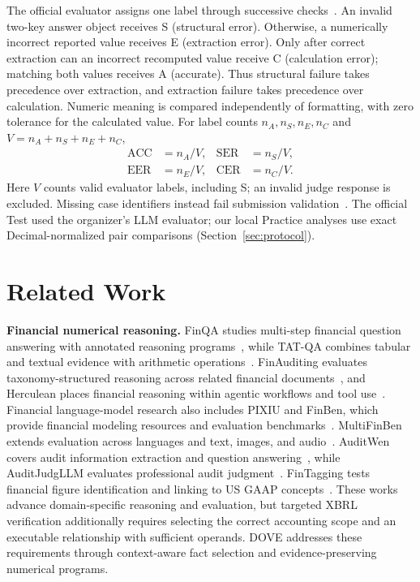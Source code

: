 \documentclass[conference]{IEEEtran}
\begin{document}
The official evaluator assigns one label through successive checks~\cite{task3scoring,task3results}. An invalid two-key answer object receives S (structural error). Otherwise, a numerically incorrect reported value receives E (extraction error). Only after correct extraction can an incorrect recomputed value receive C (calculation error); matching both values receives A (accurate). Thus structural failure takes precedence over extraction, and extraction failure takes precedence over calculation. Numeric meaning is compared independently of formatting, with zero tolerance for the calculated value. For label counts $n_A,n_S,n_E,n_C$ and $V=n_A+n_S+n_E+n_C$,
\begin{equation}
\begin{aligned}
\mathrm{ACC}&=n_A/V, & \mathrm{SER}&=n_S/V,\\
\mathrm{EER}&=n_E/V, & \mathrm{CER}&=n_C/V.
\end{aligned}
\end{equation}
Here $V$ counts valid evaluator labels, including S; an invalid judge response is excluded. Missing case identifiers instead fail submission validation~\cite{task3submission}. The official Test used the organizer's LLM evaluator; our local Practice analyses use exact Decimal-normalized pair comparisons (Section~\ref{sec:protocol}).

\section{Related Work}
\label{sec:related}

\noindent\textbf{Financial numerical reasoning.}
FinQA studies multi-step financial question answering with annotated reasoning programs~\cite{chen-etal-2021-finqa}, while TAT-QA combines tabular and textual evidence with arithmetic operations~\cite{zhu-etal-2021-tat}. FinAuditing evaluates taxonomy-structured reasoning across related financial documents~\cite{wang2026finauditing}, and Herculean places financial reasoning within agentic workflows and tool use~\cite{peng2026herculean}. Financial language-model research also includes PIXIU and FinBen, which provide financial modeling resources and evaluation benchmarks~\cite{xie2023pixiu,xie2024finben}. MultiFinBen extends evaluation across languages and text, images, and audio~\cite{peng-etal-2026-multifinben}. AuditWen covers audit information extraction and question answering~\cite{jiajia-etal-2024-auditwen}, while AuditJudgLLM evaluates professional audit judgment~\cite{huang2027auditjudgllm}. FinTagging tests financial figure identification and linking to US GAAP concepts~\cite{wang2026fintagging}. These works advance domain-specific reasoning and evaluation, but targeted XBRL verification additionally requires selecting the correct accounting scope and an executable relationship with sufficient operands. DOVE addresses these requirements through context-aware fact selection and evidence-preserving numerical programs.
\end{document}

